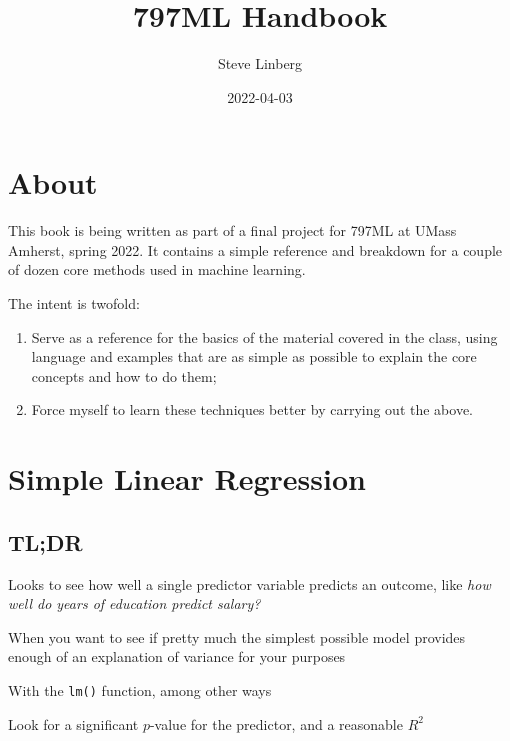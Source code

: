 \documentclass[
]{book}
\title{797ML Handbook}
\author{Steve Linberg}
\date{2022-04-03}
\providecommand{\tightlist}{%
  \setlength{\itemsep}{0pt}\setlength{\parskip}{0pt}}
\begin{document}
\maketitle

{
\setcounter{tocdepth}{1}
\tableofcontents
}
\hypertarget{about}{%
\chapter{About}\label{about}}

This book is being written as part of a final project for 797ML at UMass
Amherst, spring 2022. It contains a simple reference and breakdown for a
couple of dozen core methods used in machine learning.

The intent is twofold:

\begin{enumerate}
\def\labelenumi{\arabic{enumi}.}
\tightlist
\item
  Serve as a reference for the basics of the material covered in the class, using language and examples that are as simple as possible to explain the core concepts and how to do them;
\item
  Force myself to learn these techniques better by carrying out the above.
\end{enumerate}

\hypertarget{simple-linear-regression}{%
\chapter{Simple Linear Regression}\label{simple-linear-regression}}

\hypertarget{tldr}{%
\section{TL;DR}\label{tldr}}

\begin{description}
\tightlist
\item[What it does]
Looks to see how well a single predictor variable predicts an outcome, like \emph{how well do years of education predict salary?}
\item[When to do it]
When you want to see if pretty much the simplest possible model provides enough of an explanation of variance for your purposes
\item[How to do it]
With the \texttt{lm()} function, among other ways
\item[How to assess it]
Look for a significant \(p\)-value for the predictor, and a reasonable \(R^2\)
\end{description}
\end{document}
